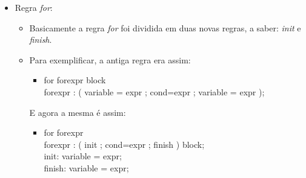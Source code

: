 \begin{itemize}
		\item Regra \textit{for}:
			\begin{itemize}
				\item Basicamente a regra \textit{for} foi dividida em duas novas regras, a saber: \textit{init} e \textit{finish}.
				
				\item Para exemplificar, a antiga regra era assim:\\
				\begin{itemize}
					\item 
					
					\textquotesingle for\textquotesingle \vspace{0.1cm} forexpr block\\
				forexpr : \textquotesingle(\textquotesingle \vspace{0.1cm} variable \textquotesingle =\textquotesingle \vspace{0.1cm} expr \textquotesingle ;\textquotesingle \vspace{0.1cm} cond=expr \textquotesingle ;\textquotesingle \vspace{0.1cm} variable \textquotesingle =\textquotesingle \vspace{0.1cm} expr \textquotesingle)\textquotesingle ;
				\end{itemize}

				
				E agora a mesma é assim:
				\begin{itemize}
					\item 
					
						\textquotesingle for\textquotesingle \vspace{0.1cm} forexpr\\
						forexpr : \textquotesingle(\textquotesingle \vspace{0.1cm} init \textquotesingle ;\textquotesingle \vspace{0.1cm} cond=expr \textquotesingle ;\textquotesingle \vspace{0.1cm} finish \textquotesingle)\textquotesingle \vspace{0.1cm} block;\\
						init: variable \textquotesingle =\textquotesingle \vspace{0.1cm} expr;\\
						finish: variable \textquotesingle =\textquotesingle \vspace{0.1cm} expr;
				\end{itemize}
				
			\end{itemize}
	\end{itemize}
	
